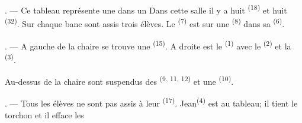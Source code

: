 \begin{VUpage}[9]{}
\VUsaut{2.0mm}
\VUsaut{3.2mm}
\VUsaut{2.6mm}
\VUsaut{3.4mm}
\VUornamento{9pt}
\VUsaut{5.0mm}
\VUsaut{3.0mm}
\VUfilet{16mm}
\VUsaut{5.6mm}

\VUsaut{1.4mm}
\VUsaut{2.2mm}
\VUfilet{20mm}
\VUsaut{6.4mm}

\VUsaut{3.0mm}

. --- Ce tableau représente une \nl
dans un  Dans cette salle il y a huit \textsuperscript{(18)}\nl
et huit \textsuperscript{(32)}. Sur chaque banc sont assis trois\nl
élèves. Le \textsuperscript{(7)} est sur une \textsuperscript{(8)}\nl
dans sa \textsuperscript{(6)}.

. --- A gauche de la chaire se trouve une \nl
{} \textsuperscript{(15)}. A droite est le \textsuperscript{(1)} avec le\nl
{}\textsuperscript{(2)} et la \textsuperscript{(3)}.

\VUblancAlinea
Au-dessus de la chaire sont suspendus des \cc
{} \textsuperscript{(9, 11, 12)} et une \cc
{}\textsuperscript{(10)}.

. --- Tous les élèves ne sont pas assis à leur\nl
{}\textsuperscript{(17)}. Jean\textsuperscript{(4)} est au tableau; il tient le torchon\nl
et il efface les 
\end{VUpage}

